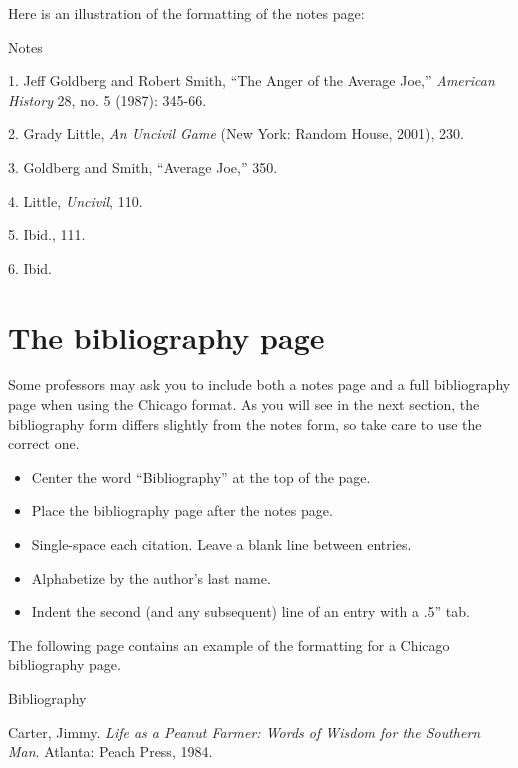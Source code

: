 Here is an illustration of the formatting of the notes page:
\newpage

\thispagestyle{empty}
\begin{center}Notes\end{center}
\smallskip

 1. Jeff Goldberg and Robert Smith, ``The Anger of the Average Joe,'' \emph{American History} 28, no. 5 (1987): 345-66.
\smallskip

 2. Grady Little, \emph{An Uncivil Game} (New York: Random House, 2001), 230.
\smallskip

 3. Goldberg and Smith, ``Average Joe,'' 350.
\smallskip

 4. Little, \emph{Uncivil}, 110.
\smallskip

 5. Ibid., 111.
\smallskip

 6. Ibid.

\newpage


\section{The bibliography page}
Some professors may ask you to include both a notes page and a full bibliography page when using the Chicago format. As you will see in the next section, the bibliography form differs slightly from the notes form, so take care to use the correct one.

\begin{itemize}
\item Center the word ``Bibliography'' at the top of the page.
\item Place the bibliography page after the notes page.
\item Single-space each citation. Leave a blank line between entries.
\item Alphabetize by the author's last name.
\item Indent the second (and any subsequent) line of an entry with a .5'' tab.
\end{itemize}

The following page contains an example of the formatting for a Chicago bibliography page.
\newpage





\thispagestyle{empty}
\begin{center}Bibliography\end{center}

Carter, Jimmy. \emph{Life as a Peanut Farmer: Words of Wisdom for the Southern Man}.  Atlanta: Peach Press, 1984.

